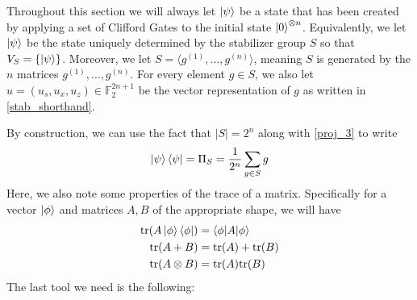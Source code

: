 \documentclass[11pt]{article}
\theoremstyle{definition}
\theoremstyle{plain}
\begin{document}
Throughout this section we will always let $\ket{\psi}$ be a state that has been created by applying a set of Clifford Gates to the initial state $\ket{0}^{\otimes n}$. Equivalently, we let $\ket{\psi}$ be the state uniquely determined by the stabilizer group $S$ so that $V_S = \{ \ket{\psi} \}$. Moreover, we let $S = \langle g^{(1)}, \ldots, g^{(n)} \rangle$, meaning $S$ is generated by the $n$ matrices $g^{(1)}, \ldots, g^{(n)}$. For every element $g \in S$, we also let $u = (u_s, u_x, u_z) \in \mathbb{F}_2^{2n+1}$ be the vector representation of $g$ as written in {\ref{stab_shorthand}}.

By construction, we can use the fact that $|S| = 2^n$ along with {\ref{proj_3}} to write
\begin{equation}\label{prelim_1} 
  \ket{\psi} \bra{\psi} = \Pi_S = \frac{1}{2^n} \sum\limits_{g \in S} g
\end{equation}
Here, we also note some properties of the trace of a matrix. Specifically for a vector $\ket{\phi}$ and matrices $A, B$ of the appropriate shape, we will have
\begin{align}
  \text{tr}(A \ket{\phi} \bra{\phi}) &=  \braket{\phi | A | \phi} \\
  \text{tr}(A + B) &= \text{tr}(A) + \text{tr}(B) \\ 
  \text{tr}(A \otimes B) &= \text{tr}(A) \text{tr}(B)
\end{align}
The last tool we need is the following:\\
\end{document}
